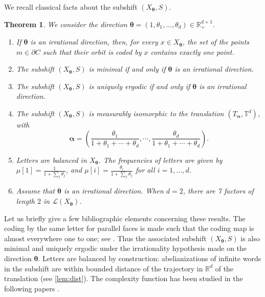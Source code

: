 \documentclass{article}
\newtheorem{theorem}[lemma]{Theorem}
\theoremstyle{definition}
\newcommand{\T}{\mathbb{T}}
\newcommand{\R}{\mathbb{R}}
\newcommand{\btheta}{\boldsymbol{\theta}}
\newcommand{\balpha}{\boldsymbol{\alpha}}
\begin{document}
We recall classical  facts about the subshift $(X_{\btheta},S)$.
\begin{theorem}\label{thm-rappel}
We consider the  direction ${\btheta}= (1,\theta_1, \ldots, \theta_d) \in \R^{d+1}_+$.
\begin{enumerate}
\item If ${\btheta}$ is an irrational direction, then, for every $x\in X_{\btheta}$, the set of  the  points $m\in \partial{C}$ such that their orbit is coded by $x$ contains  exactly one point.
\item The subshift $(X_{\btheta},S)$ is minimal if and only if $\btheta$ is an irrational direction.
\item The subshift $(X_{\btheta},S)$ is uniquely ergodic if and only if $\btheta$ is an irrational direction. %
\item The subshift  $(X_{\btheta},S)$ is measurably isomorphic  to the translation  $(T_{\balpha},\T^{d})$, with $$\balpha=\left(\frac{\theta_1}{1+\theta_1+\cdots+\theta_d},\cdots, \frac{\theta_d}{1+\theta_1+\cdots+ \theta_d}\right).$$
\item Letters are balanced in $X_{\btheta}$. The frequencies of letters    are given by   $ \mu[1]=\frac{ 1}{ 1 + \sum_j \theta_j}$, and  $ \mu[i]=\frac{ \theta_i}{ 1 + \sum_j \theta_j}$ for all $i=1, \ldots, d$.
\item   Assume that  ${\btheta}$ is an irrational direction. When $d=2$, there are  7 factors of length $2$ in ${\mathcal L}(X_{\btheta})$.
\end{enumerate}
\end{theorem}


Let us  briefly  give a  few bibliographic   elements  concerning  these results. The coding by the same letter for parallel faces is made such that the coding map  is almost everywhere one to one; see \cite{Ga.Kr.Tr}. Thus the associated subshift
$(X_{\btheta},S)$  is also minimal and uniquely ergodic under the  irrationality hypothesis  made on the direction $\btheta$. 
Letters are balanced by construction: abelianizations of infinite words in the subshift are within bounded distance of the trajectory in ${\mathbb R}^d$ of  the translation (see \cref{lem:dist}). The complexity function has been studied in the following papers \cite{Ar.Ma.Sh.Ta.94, Bary.95, Bed.03, Bed:09}.
\end{document}
